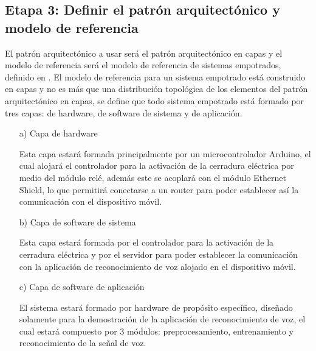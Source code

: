 \subsection{Etapa 3: Definir el patrón arquitectónico y modelo de referencia}
El patrón arquitectónico a usar será el patrón arquitectónico en capas y el modelo de referencia será el modelo de referencia de sistemas empotrados, definido en \citep{tammy}. El modelo de referencia para un sistema empotrado está construido en capas y no es más que una distribución topológica de los elementos del patrón arquitectónico en capas, se define que todo sistema empotrado está formado por tres capas: de hardware, de software de sistema y de aplicación.

\begin{enumerate}
\item[a)]Capa de hardware
\par
Esta capa estará formada principalmente por un microcontrolador Arduino, el cual alojará el controlador para la activación de la cerradura eléctrica por medio del módulo relé, además este se acoplará con el módulo Ethernet Shield, lo que permitirá conectarse a un router para poder establecer así la comunicación con el dispositivo móvil.

\item[b)]Capa de software de sistema
\par
Esta capa estará formada por el controlador para la activación de la cerradura eléctrica y por el servidor para poder establecer la comunicación con la aplicación de reconocimiento de voz alojado en el dispositivo móvil.

\item[c)]Capa de software de aplicación
\par
El sistema estará formado por hardware de propósito específico, diseñado solamente para la demostración de la aplicación de reconocimiento de voz, el cual estará compuesto por 3 módulos: preprocesamiento, entrenamiento y reconocimiento de la señal de voz.


\end{enumerate}
